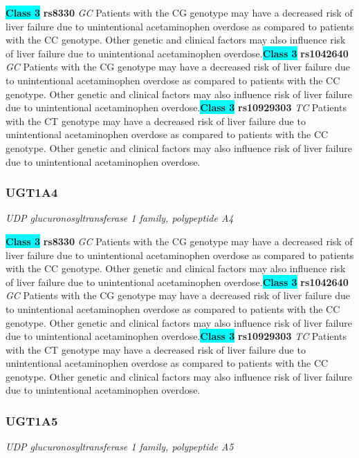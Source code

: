 \documentclass{report}
\begin{document}
\textbf{\colorbox{cyan} {Class 3}} \textbf{ rs8330 } \textit{ GC }
Patients with the CG genotype may have a decreased risk of liver failure due to unintentional acetaminophen overdose as compared to patients with the CC genotype. Other genetic and clinical factors may also influence risk of liver failure due to unintentional acetaminophen overdose.\newline\textbf{\colorbox{cyan} {Class 3}} \textbf{ rs1042640 } \textit{ GC }
Patients with the CG genotype may have a decreased risk of liver failure due to unintentional acetaminophen overdose as compared to patients with the CC genotype. Other genetic and clinical factors may also influence risk of liver failure due to unintentional acetaminophen overdose.\newline\textbf{\colorbox{cyan} {Class 3}} \textbf{ rs10929303 } \textit{ TC }
Patients with the CT genotype may have a decreased risk of liver failure due to unintentional acetaminophen overdose as compared to patients with the CC genotype. Other genetic and clinical factors may also influence risk of liver failure due to unintentional acetaminophen overdose.\newline\subsubsection{ UGT1A4 }
\textit{ UDP glucuronosyltransferase 1 family, polypeptide A4 }

\textbf{\colorbox{cyan} {Class 3}} \textbf{ rs8330 } \textit{ GC }
Patients with the CG genotype may have a decreased risk of liver failure due to unintentional acetaminophen overdose as compared to patients with the CC genotype. Other genetic and clinical factors may also influence risk of liver failure due to unintentional acetaminophen overdose.\newline\textbf{\colorbox{cyan} {Class 3}} \textbf{ rs1042640 } \textit{ GC }
Patients with the CG genotype may have a decreased risk of liver failure due to unintentional acetaminophen overdose as compared to patients with the CC genotype. Other genetic and clinical factors may also influence risk of liver failure due to unintentional acetaminophen overdose.\newline\textbf{\colorbox{cyan} {Class 3}} \textbf{ rs10929303 } \textit{ TC }
Patients with the CT genotype may have a decreased risk of liver failure due to unintentional acetaminophen overdose as compared to patients with the CC genotype. Other genetic and clinical factors may also influence risk of liver failure due to unintentional acetaminophen overdose.\newline\subsubsection{ UGT1A5 }
\textit{ UDP glucuronosyltransferase 1 family, polypeptide A5 }
\end{document}
